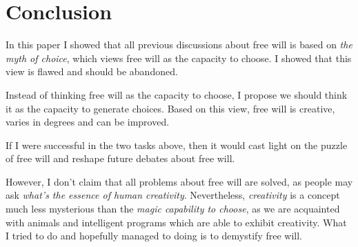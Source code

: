 \section{Conclusion}

In this paper I showed that all previous discussions about free will is based on \emph{the myth of choice}, which views free will as the capacity to choose. I showed that this view is flawed and should be abandoned.

Instead of thinking free will as the capacity to choose, I propose we should think it as the capacity to generate choices. Based on this view, free will is creative, varies in degrees and can be improved.

If I were successful in the two tasks above, then it would cast light on the puzzle of free will and reshape future debates about free will.

However, I don't claim that all problems about free will are solved, as people may ask \emph{what's the essence of human creativity}. Nevertheless, \emph{creativity} is a concept much less mysterious than the \emph{magic capability to choose}, as we are acquainted with animals and intelligent programs which are able to exhibit creativity. What I tried to do and hopefully managed to doing is to demystify free will.
